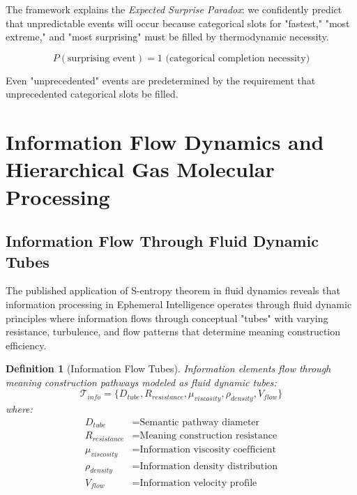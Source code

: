 \documentclass[12pt,a4paper]{article}
\newtheorem{definition}{Definition}
\begin{document}
The framework explains the \textit{Expected Surprise Paradox}: we confidently predict that unpredictable events will occur because categorical slots for "fastest," "most extreme," and "most surprising" must be filled by thermodynamic necessity.

\begin{equation}
P(\text{surprising event}) = 1 \text{ (categorical completion necessity)}
\end{equation}

Even "unprecedented" events are predetermined by the requirement that unprecedented categorical slots be filled.

\section{Information Flow Dynamics and Hierarchical Gas Molecular Processing}

\subsection{Information Flow Through Fluid Dynamic Tubes}

The published application of S-entropy theorem in fluid dynamics reveals that information processing in Ephemeral Intelligence operates through fluid dynamic principles where information flows through conceptual "tubes" with varying resistance, turbulence, and flow patterns that determine meaning construction efficiency.

\begin{definition}[Information Flow Tubes]
Information elements flow through meaning construction pathways modeled as fluid dynamic tubes:
\begin{equation}
\mathcal{T}_{info} = \{D_{tube}, R_{resistance}, \mu_{viscosity}, \rho_{density}, V_{flow}\}
\end{equation}
where:
\begin{align}
D_{tube} &= \text{Semantic pathway diameter} \\
R_{resistance} &= \text{Meaning construction resistance} \\
\mu_{viscosity} &= \text{Information viscosity coefficient} \\
\rho_{density} &= \text{Information density distribution} \\
V_{flow} &= \text{Information velocity profile}
\end{align}
\end{definition}
\end{document}
